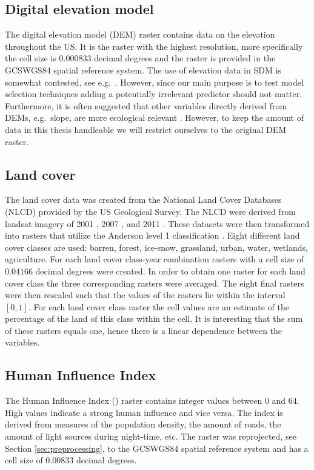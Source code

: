 \subsection{Digital elevation model}
The digital elevation model (DEM) raster \parencite{DEM} contains data on the elevation throughout the US. It is the raster with the highest resolution, more specifically the cell size is $0.000833$ decimal degrees and the raster is provided in the GCS\textunderscore WGS84 spatial reference system. The use of elevation data in SDM is somewhat contested, see e.g.\ \cite{hof_usefulness_2012, oke_distribution_2015}. However, since our main purpose is to test model selection techniques adding a potentially irrelevant predictor should not matter. Furthermore, it is often suggested that other variables directly derived from DEMs, e.g.\ slope, are more ecological relevant \parencite{franklin_mapping_2009}. However, to keep the amount of data in this thesis handleable we will restrict ourselves to the original DEM raster.


\subsection{Land cover}
The land cover data was created from the National Land Cover Databases (NLCD) provided by the US Geological Survey. The NLCD were derived from landsat imagery of 2001 \parencite{vogelmann2001completion}, 2007 \parencite{homer2007completion}, and 2011 \parencite{fry2011completion}. These datasets were then transformed into rasters that utilize the Anderson level 1 classification \parencite{anderson_land_1976}. Eight different land cover classes are used: barren, forest, ice-snow, grassland, urban, water, wetlands, agriculture. For each land cover class-year combination rasters with a cell size of $0.04166$ decimal degrees were created. In order to obtain one raster for each land cover class the three corresponding rasters were averaged. The eight final rasters were then rescaled such that the values of the rasters lie within the interval $[0,1]$. For each land cover class raster the cell values are an estimate of the percentage of the land of this class within the cell. It is interesting that the sum of these rasters equals one, hence there is a linear dependence between the variables.

\subsection{Human Influence Index}
The Human Influence Index (\citeauthor{hii}) raster contains integer values between $0$ and $64$. High values indicate a strong human influence and vice versa. The index is derived from measures of the population density, the amount of roads, the amount of light sources during night-time, etc. The raster was reprojected, see Section \ref{sec:preprocessing}, to the GCS\textunderscore WGS84 spatial reference system and has a cell size of $0.00833$ decimal degrees.

